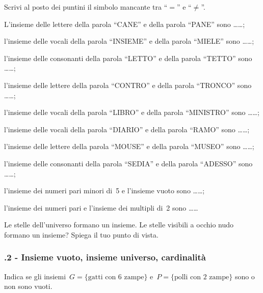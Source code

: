 \begin{esercizio}
\label{ese:5.8}
Scrivi al posto dei puntini il simbolo mancante tra ``$=$'' e ``${\neq}$''.
\begin{enumeratea}
\item L'insieme delle lettere della parola ``CANE'' e della parola ``PANE'' sono \ldots\ldots;
\item l'insieme delle vocali della parola ``INSIEME'' e della parola ``MIELE'' sono \ldots\ldots;
\item l'insieme delle consonanti della parola ``LETTO'' e della parola ``TETTO'' sono \ldots\ldots;
\item l'insieme delle lettere della parola ``CONTRO'' e della parola ``TRONCO'' sono \ldots\ldots;
\item l'insieme delle vocali della parola ``LIBRO'' e della parola ``MINISTRO'' sono \ldots\ldots;
\item l'insieme delle vocali della parola ``DIARIO'' e della parola ``RAMO'' sono \ldots\ldots;
\item l'insieme delle lettere della parola ``MOUSE'' e della parola ``MUSEO'' sono \ldots\ldots;
\item l'insieme delle consonanti della parola ``SEDIA'' e della parola ``ADESSO'' sono \ldots\ldots;
\item l'insieme dei numeri pari minori di~5 e l'insieme vuoto sono \ldots\ldots;
\item l'insieme dei numeri pari e l'insieme dei multipli di~2 sono \ldots\ldots
\end{enumeratea}
\end{esercizio}

\begin{esercizio}
\label{ese:5.9}
Le stelle dell'universo formano un insieme. Le stelle visibili a occhio nudo formano un insieme? Spiega il tuo punto di vista.
\end{esercizio}

\subsubsection*{\thechapter.2 - Insieme vuoto, insieme universo, cardinalità}
\begin{esercizio}
\label{ese:5.10}
Indica se gli insiemi~$G =\{\text{gatti con~6 zampe}\}$ e~$P = \{\text{polli con~2 zampe}\}$ sono o non sono vuoti.
\end{esercizio}

